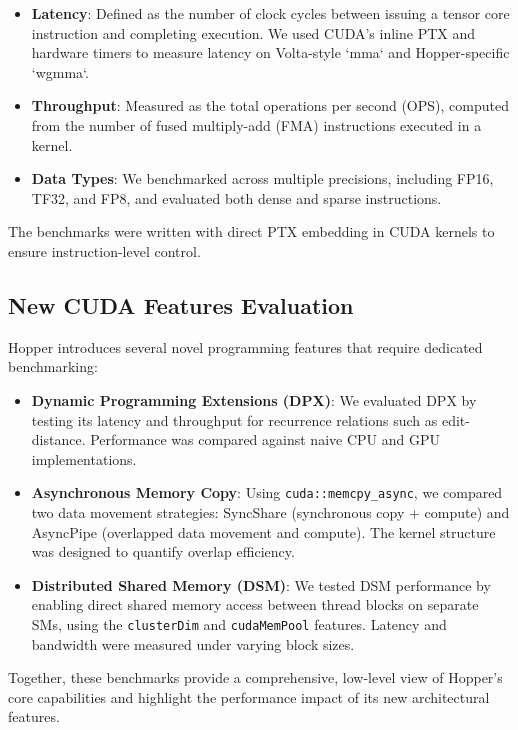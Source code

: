 \begin{itemize}
    \item \textbf{Latency}: Defined as the number of clock cycles between issuing a tensor core instruction and completing execution. We used CUDA's inline PTX and hardware timers to measure latency on Volta-style `mma` and Hopper-specific `wgmma`.
    \item \textbf{Throughput}: Measured as the total operations per second (OPS), computed from the number of fused multiply-add (FMA) instructions executed in a kernel.
    \item \textbf{Data Types}: We benchmarked across multiple precisions, including FP16, TF32, and FP8, and evaluated both dense and sparse instructions.
\end{itemize}

The benchmarks were written with direct PTX embedding in CUDA kernels to ensure instruction-level control.

\subsection{New CUDA Features Evaluation}

Hopper introduces several novel programming features that require dedicated benchmarking:

\begin{itemize}
    \item \textbf{Dynamic Programming Extensions (DPX)}: We evaluated DPX by testing its latency and throughput for recurrence relations such as edit-distance. Performance was compared against naive CPU and GPU implementations.

    \item \textbf{Asynchronous Memory Copy}: Using \texttt{cuda::memcpy\_async}, we compared two data movement strategies: SyncShare (synchronous copy + compute) and AsyncPipe (overlapped data movement and compute). The kernel structure was designed to quantify overlap efficiency.

    \item \textbf{Distributed Shared Memory (DSM)}: We tested DSM performance by enabling direct shared memory access between thread blocks on separate SMs, using the \texttt{clusterDim} and \texttt{cudaMemPool} features. Latency and bandwidth were measured under varying block sizes.
\end{itemize}


Together, these benchmarks provide a comprehensive, low-level view of Hopper’s core capabilities and highlight the performance impact of its new architectural features.

